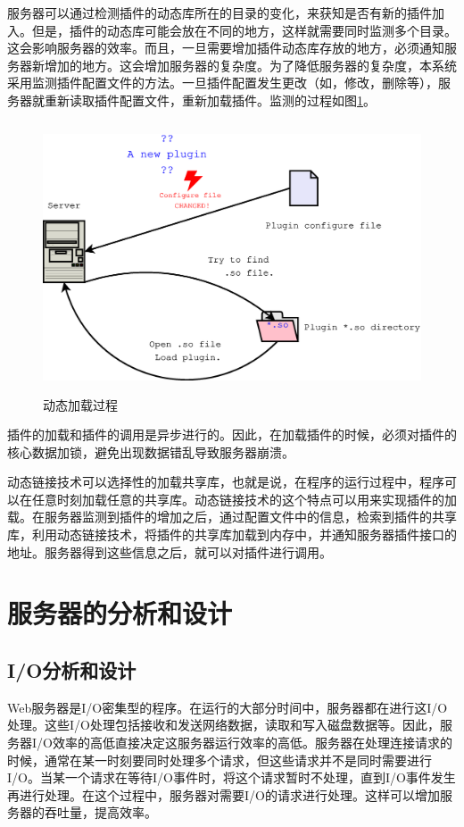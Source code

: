 \documentclass[twoside, xetex]{report}
\begin{document}
	服务器可以通过检测插件的动态库所在的目录的变化，来获知是否有新的插件加入。但是，插件的动态库可能会放在不同的地方，这样就需要同时监测多个目录。这会影响服务器的效率。而且，一旦需要增加插件动态库存放的地方，必须通知服务器新增加的地方。这会增加服务器的复杂度。为了降低服务器的复杂度，本系统采用监测插件配置文件的方法。一旦插件配置发生更改（如，修改，删除等），服务器就重新读取插件配置文件，重新加载插件。监测的过程如图\ref{loadplugin}。
	\begin{figure}[htbp]
	\centering
	\includegraphics[height=8cm, width=13cm]{pics/loadplugin.eps}
	\caption{动态加载过程}
	\label{loadplugin}
	\end{figure}
	
	插件的加载和插件的调用是异步进行的。因此，在加载插件的时候，必须对插件的核心数据加锁，避免出现数据错乱导致服务器崩溃。
	
	动态链接技术可以选择性的加载共享库，也就是说，在程序的运行过程中，程序可以在任意时刻加载任意的共享库。动态链接技术的这个特点可以用来实现插件的加载。在服务器监测到插件的增加之后，通过配置文件中的信息，检索到插件的共享库，利用动态链接技术，将插件的共享库加载到内存中，并通知服务器插件接口的地址。服务器得到这些信息之后，就可以对插件进行调用。

\section{服务器的分析和设计}
\subsection{I/O分析和设计}
	Web服务器是I/O密集型的程序。在运行的大部分时间中，服务器都在进行这I/O处理。这些I/O处理包括接收和发送网络数据，读取和写入磁盘数据等。因此，服务器I/O效率的高低直接决定这服务器运行效率的高低。服务器在处理连接请求的时候，通常在某一时刻要同时处理多个请求，但这些请求并不是同时需要进行I/O。当某一个请求在等待I/O事件时，将这个请求暂时不处理，直到I/O事件发生再进行处理。在这个过程中，服务器对需要I/O的请求进行处理。这样可以增加服务器的吞吐量，提高效率。
	
\end{document}
